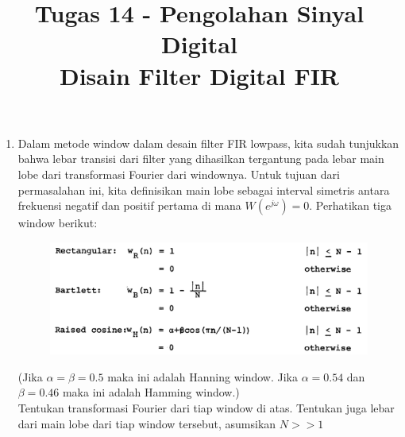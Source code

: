 \documentclass[12pt,a4paper]{article}
\title{Tugas 14 - Pengolahan Sinyal Digital\\
	Disain Filter Digital FIR}
\date{}
\begin{document}
	\maketitle
	\date{}
	\begin{enumerate}
		\item Dalam metode window dalam desain filter FIR lowpass, kita sudah tunjukkan bahwa lebar transisi dari filter yang dihasilkan tergantung pada lebar main lobe dari transformasi Fourier dari windownya. Untuk tujuan dari permasalahan ini, kita definisikan main lobe sebagai interval simetris antara frekuensi negatif dan positif pertama di mana $ W(e^{j\omega}) = 0 $. Perhatikan tiga window berikut:
		
		\begin{figure}[H]
			\centering
			\includegraphics[width=0.8\linewidth]{img/img01}
		\end{figure}
		
		(Jika $ \alpha = \beta = 0.5 $ maka ini adalah Hanning window. Jika $ \alpha = 0.54 $ dan $ \beta = 0.46 $ maka ini adalah Hamming window.)\\
		
		
		Tentukan transformasi Fourier dari tiap window di atas. Tentukan juga lebar dari main lobe dari tiap window tersebut, asumsikan $ N >> 1 $
	\end{enumerate}
\end{document}

